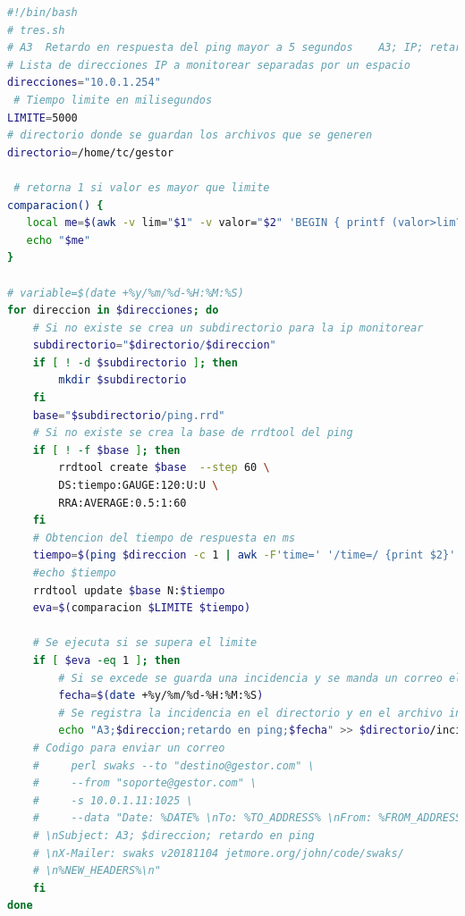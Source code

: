 \documentclass[12pt, titlepage]{article}
\begin{document}
\begin{lstlisting}[language=bash]
 #!/bin/bash
# tres.sh
# A3  Retardo en respuesta del ping mayor a 5 segundos    A3; IP; retardo en ping
# Lista de direcciones IP a monitorear separadas por un espacio
direcciones="10.0.1.254"
 # Tiempo limite en milisegundos
LIMITE=5000
# directorio donde se guardan los archivos que se generen
directorio=/home/tc/gestor

 # retorna 1 si valor es mayor que limite
comparacion() {
   local me=$(awk -v lim="$1" -v valor="$2" 'BEGIN { printf (valor>lim?1:0) }')
   echo "$me"
}

# variable=$(date +%y/%m/%d-%H:%M:%S)
for direccion in $direcciones; do
    # Si no existe se crea un subdirectorio para la ip monitorear
    subdirectorio="$directorio/$direccion"
    if [ ! -d $subdirectorio ]; then
        mkdir $subdirectorio
    fi
    base="$subdirectorio/ping.rrd"
    # Si no existe se crea la base de rrdtool del ping
    if [ ! -f $base ]; then
        rrdtool create $base  --step 60 \
        DS:tiempo:GAUGE:120:U:U \
        RRA:AVERAGE:0.5:1:60
    fi
    # Obtencion del tiempo de respuesta en ms
    tiempo=$(ping $direccion -c 1 | awk -F'time=' '/time=/ {print $2}' | awk -F' ' '{print $1}')
    #echo $tiempo
    rrdtool update $base N:$tiempo
    eva=$(comparacion $LIMITE $tiempo)

    # Se ejecuta si se supera el limite
    if [ $eva -eq 1 ]; then
        # Si se excede se guarda una incidencia y se manda un correo electronico
        fecha=$(date +%y/%m/%d-%H:%M:%S)
        # Se registra la incidencia en el directorio y en el archivo incidencias
        echo "A3;$direccion;retardo en ping;$fecha" >> $directorio/incidencias.log
    # Codigo para enviar un correo
    #     perl swaks --to "destino@gestor.com" \
    #     --from "soporte@gestor.com" \
    #     -s 10.0.1.11:1025 \
    #     --data "Date: %DATE% \nTo: %TO_ADDRESS% \nFrom: %FROM_ADDRESS% 
    # \nSubject: A3; $direccion; retardo en ping 
    # \nX-Mailer: swaks v20181104 jetmore.org/john/code/swaks/
    # \n%NEW_HEADERS%\n"
    fi
done

\end{lstlisting}
\end{document}
